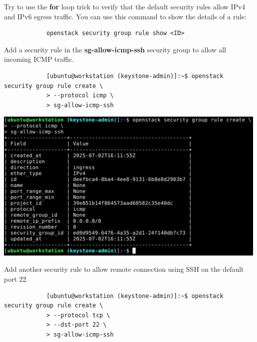 \documentclass[letterpaper, 12pt]{article}
\begin{document}
\begin{enumerate}
    \begin{tipbox}
        Try to use the \textbf{for} loop trick to verify that the default security rules allow IPv4 and IPv6 egress traffic.
        You can use this command to show the details of a rule:
        \begin{lstlisting}
            openstack security group rule show <ID>
        \end{lstlisting}
    \end{tipbox}

    \begin{labstep}
        Add a security rule in the \textbf{sg-allow-icmp-ssh} security group to allow all incoming ICMP traffic.
        \begin{lstlisting}
            [ubuntu@workstation (keystone-admin)]:~$ openstack security group rule create \
            > --protocol icmp \
            > sg-allow-icmp-ssh
        \end{lstlisting}

        \begin{center}
            \includegraphics[width=\linewidth]{images/part9/step26.png}
        \end{center}
    \end{labstep}

    \begin{labstep}
        Add another security rule to allow remote connection using SSH on the default port 22.
        \begin{lstlisting}
            [ubuntu@workstation (keystone-admin)]:~$ openstack security group rule create \
            > --protocol tcp \
            > --dst-port 22 \
            > sg-allow-icmp-ssh
        \end{lstlisting}


\end{labstep}
\end{enumerate}
\end{document}
